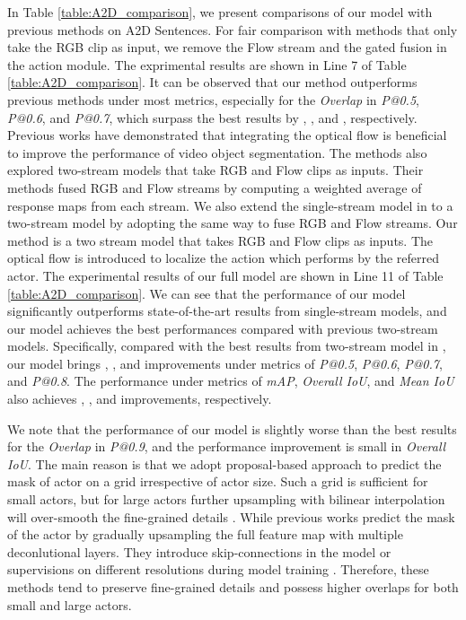 \documentclass[journal]{IEEEtran}
\begin{document}
In Table \ref{table:A2D_comparison}, we present comparisons of our model with previous methods on A2D Sentences. For fair comparison with methods that only take the RGB clip as input, we remove the Flow stream and the gated fusion in the action module. The exprimental results are shown in Line 7 of Table \ref{table:A2D_comparison}. It can be observed that our method outperforms previous methods under most metrics, especially for the \emph{Overlap} in \emph{P@0.5}, \emph{P@0.6}, and \emph{P@0.7}, which surpass the best results by , , and , respectively. Previous works \cite{fusionseg,monet,2019Lucid} have demonstrated that integrating the optical flow is beneficial to improve the performance of video object segmentation. The methods \cite{gavrilyuk2018actor,wang2019asymmetric} also explored two-stream models that take RGB and Flow clips as inputs. Their methods fused RGB and Flow streams by computing a weighted average of response maps from each stream. We also extend the single-stream model in \cite{wang2020context} to a two-stream model by adopting the same way to fuse RGB and Flow streams. Our method is a two stream model that takes RGB and Flow clips as inputs. The optical flow is introduced to localize the action which performs by the referred actor. The experimental results of our full model are shown in Line 11 of Table \ref{table:A2D_comparison}. We can see that the performance of our model significantly outperforms state-of-the-art results from single-stream models, and our model achieves the best performances compared with previous two-stream models. Specifically, compared with the best results from two-stream model in \cite{wang2020context}, our model brings , ,  and  improvements under metrics of \emph{P@0.5}, \emph{P@0.6}, \emph{P@0.7}, and \emph{P@0.8}. The performance under metrics of \emph{mAP}, \emph{Overall IoU}, and \emph{Mean IoU} also achieves , , and  improvements, respectively.

We note that the performance of our model is slightly worse than the best results for the \emph{Overlap} in \emph{P@0.9}, and the performance improvement is small in \emph{Overall IoU}. The main reason is that we adopt proposal-based approach \cite{he2017mask} to predict the mask of actor on a  grid irrespective of actor size. Such a grid is sufficient for small actors, but for large actors further upsampling with bilinear interpolation will over-smooth the fine-grained details \cite{pointRend}. While previous works \cite{gavrilyuk2018actor,wang2019asymmetric,wang2020context,mcintosh2018multi} predict the mask of the actor by gradually upsampling the full feature map with multiple deconlutional layers. They introduce skip-connections in the model \cite{mcintosh2018multi} or supervisions on different resolutions during model training \cite{gavrilyuk2018actor,wang2019asymmetric}. Therefore, these methods tend to preserve fine-grained details and possess higher overlaps for both small and large actors.
\end{document}
